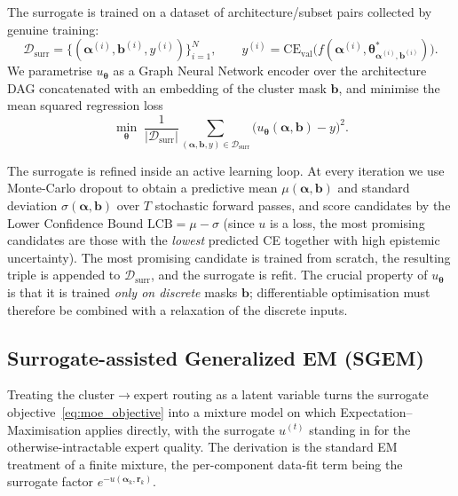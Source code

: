 The surrogate is trained on a dataset of architecture/subset pairs
collected by genuine training:
\begin{equation}
\mathcal{D}_{\text{surr}} = \{(\boldsymbol{\alpha}^{(i)}, \boldsymbol{b}^{(i)}, y^{(i)})\}_{i=1}^{N}, \qquad
y^{(i)} = \mathrm{CE}_{\mathrm{val}}\!\bigl(f(\boldsymbol{\alpha}^{(i)}, \boldsymbol{\theta}^*_{\boldsymbol{\alpha}^{(i)}, \boldsymbol{b}^{(i)}})\bigr).
\end{equation}
We parametrise $u_{\boldsymbol{\theta}}$ as a Graph Neural Network
encoder over the architecture DAG concatenated with an embedding of
the cluster mask $\boldsymbol{b}$, and minimise the mean squared
regression loss
\begin{equation}
\label{eq:surr_training}
\min_{\boldsymbol{\theta}} \;
\frac{1}{|\mathcal{D}_{\text{surr}}|}
\sum_{(\boldsymbol{\alpha}, \boldsymbol{b}, y) \in \mathcal{D}_{\text{surr}}}
\bigl(u_{\boldsymbol{\theta}}(\boldsymbol{\alpha}, \boldsymbol{b}) - y\bigr)^2.
\end{equation}

The surrogate is refined inside an active learning loop. At every
iteration we use Monte-Carlo dropout to obtain a predictive mean
$\mu(\boldsymbol{\alpha}, \boldsymbol{b})$ and standard deviation
$\sigma(\boldsymbol{\alpha}, \boldsymbol{b})$ over $T$ stochastic
forward passes, and score candidates by the Lower Confidence Bound
$\mathrm{LCB} = \mu - \sigma$ (since $u$ is a loss, the most
promising candidates are those with the \emph{lowest} predicted CE
together with high epistemic uncertainty). The most promising
candidate is trained from scratch, the resulting triple is appended
to $\mathcal{D}_{\text{surr}}$, and the surrogate is refit. The crucial
property of $u_{\boldsymbol{\theta}}$ is that it is trained
\emph{only on discrete} masks $\boldsymbol{b}$; differentiable
optimisation must therefore be combined with a relaxation of the
discrete inputs.

\subsection{Surrogate-assisted Generalized EM (SGEM)}
\label{subsec:sgem}

Treating the cluster$\to$expert routing as a latent variable turns the
surrogate objective~\eqref{eq:moe_objective} into a mixture model on
which Expectation--Maximisation applies directly, with the surrogate
$u^{(t)}$ standing in for the otherwise-intractable expert quality. The
derivation is the standard EM treatment of a finite mixture, the
per-component data-fit term being the surrogate factor
$e^{-u(\boldsymbol{\alpha}_k, \mathbf{r}_k)}$.

